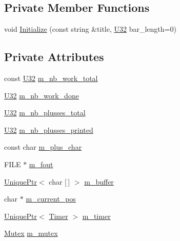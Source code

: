 \subsection*{Private Member Functions}
\begin{DoxyCompactItemize}
\item 
void \hyperlink{classmage_1_1_progress_reporter_a9eb8d1c64e2768f539cd3867b29bf408}{Initialize} (const string \&title, \hyperlink{namespacemage_a41c104c036fba3756a74e19f793eeaa1}{U32} bar\+\_\+length=0)
\end{DoxyCompactItemize}
\subsection*{Private Attributes}
\begin{DoxyCompactItemize}
\item 
const \hyperlink{namespacemage_a41c104c036fba3756a74e19f793eeaa1}{U32} \hyperlink{classmage_1_1_progress_reporter_a2da5863295669e3f6111f5508a4d30f7}{m\+\_\+nb\+\_\+work\+\_\+total}
\item 
\hyperlink{namespacemage_a41c104c036fba3756a74e19f793eeaa1}{U32} \hyperlink{classmage_1_1_progress_reporter_a94bdbb09ae95976c72f1a8387ff96b70}{m\+\_\+nb\+\_\+work\+\_\+done}
\item 
\hyperlink{namespacemage_a41c104c036fba3756a74e19f793eeaa1}{U32} \hyperlink{classmage_1_1_progress_reporter_a9afda919e0fa57c8aa7a6667385318c9}{m\+\_\+nb\+\_\+plusses\+\_\+total}
\item 
\hyperlink{namespacemage_a41c104c036fba3756a74e19f793eeaa1}{U32} \hyperlink{classmage_1_1_progress_reporter_a0279302ea777f9db2735fff1a8ae2d26}{m\+\_\+nb\+\_\+plusses\+\_\+printed}
\item 
const char \hyperlink{classmage_1_1_progress_reporter_ab3c8d12e79e63ae2b99fde8d6627c230}{m\+\_\+plus\+\_\+char}
\item 
F\+I\+LE $\ast$ \hyperlink{classmage_1_1_progress_reporter_ad325ee5978fd1d16a97acbe37a977982}{m\+\_\+fout}
\item 
\hyperlink{namespacemage_a3316d7143a973e37adf1110f2e80ca31}{Unique\+Ptr}$<$ char \mbox{[}$\,$\mbox{]} $>$ \hyperlink{classmage_1_1_progress_reporter_a725763db34f5bbb7408107d55ee43beb}{m\+\_\+buffer}
\item 
char $\ast$ \hyperlink{classmage_1_1_progress_reporter_a7adafaaf90edf29c8c27f4008aea41c9}{m\+\_\+current\+\_\+pos}
\item 
\hyperlink{namespacemage_a3316d7143a973e37adf1110f2e80ca31}{Unique\+Ptr}$<$ \hyperlink{classmage_1_1_timer}{Timer} $>$ \hyperlink{classmage_1_1_progress_reporter_a4c5c81ce84ceaab7764bd640a18db788}{m\+\_\+timer}
\item 
\hyperlink{structmage_1_1_mutex}{Mutex} \hyperlink{classmage_1_1_progress_reporter_a32a499aa1b8fccbc8393fe32305dfeb1}{m\+\_\+mutex}
\end{DoxyCompactItemize}


